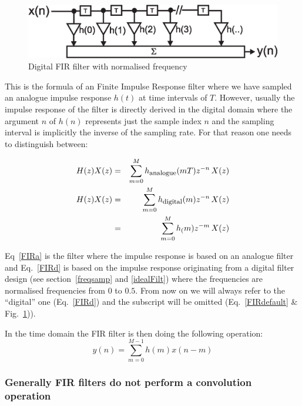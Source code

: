 \documentclass[12pt,a4paper]{article}
\begin{document}
\begin{figure}[!hbt]
\begin{center}
\mbox{\includegraphics[width=\linewidth]{fir_digital}}
\caption{Digital FIR filter with normalised frequency \label{fir_digital}}
\end{center}
\end{figure}

This is the formula of an Finite Impulse Response filter where we have
sampled an analogue impulse response $h(t)$ at time intervals of $T$.
However, usually the impulse response of the filter is directly derived
in the digital domain where the argument $n$ of $h(n)$ represents just the sample
index $n$ and the sampling interval is implicitly the inverse of the sampling
rate. For that reason one needs to distinguish between:

\begin{eqnarray}
H(z)X(z) & = & \sum_{m=0}^M h_\textrm{\footnotesize{analogue}}(mT) z^{-n} \, X(z) \label{FIRa} \\
H(z)X(z) & = & \sum_{m=0}^M h_\textrm{\footnotesize{digital}}(m) z^{-n} \, X(z) \label{FIRd} \\
         & = & \sum_{m=0}^M h_(m) z^{-m} \, X(z) \label{FIRdefault}
\end{eqnarray}

Eq~\ref{FIRa} is the filter where the impulse response is based on an analogue
filter and Eq.~\ref{FIRd} is based on the impulse response originating from a digital filter
design (see section~\ref{freqsamp} and \ref{idealFilt}) where the frequencies
are normalised frequencies from $0$ to $0.5$. From now on we will
always refer to the ``digital'' one (Eq.~\ref{FIRd}) and the subscript will be
omitted (Eq.~\ref{FIRdefault} \& Fig.~\ref{fir_digital})).

In the time domain the FIR filter is then doing the following operation:
\begin{equation}
  y(n) = \sum_{m=0}^{M-1} h(m) x(n-m) \label{FIRtime}
\end{equation}

\subsubsection{Generally FIR filters do not perform a convolution operation}
\end{document}
